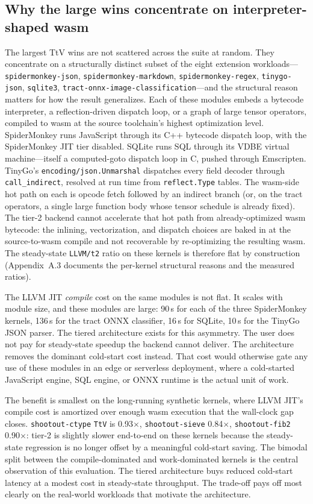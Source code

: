 \subsection*{Why the large wins concentrate on interpreter-shaped wasm}
\label{sec:eval:tt:interpreter}

The largest TtV wins are not scattered across the suite at random. They concentrate on a structurally distinct subset of the eight extension workloads---\texttt{spidermonkey-json}, \texttt{spidermonkey-markdown}, \texttt{spidermonkey-regex}, \texttt{tinygo-json}, \texttt{sqlite3}, \texttt{tract-onnx-image-classification}---and the structural reason matters for how the result generalizes. Each of these modules embeds a bytecode interpreter, a reflection-driven dispatch loop, or a graph of large tensor operators, compiled to wasm at the source toolchain's highest optimization level. SpiderMonkey runs JavaScript through its C++ bytecode dispatch loop, with the SpiderMonkey JIT tier disabled. SQLite runs SQL through its VDBE virtual machine---itself a computed-goto dispatch loop in C, pushed through Emscripten. TinyGo's \texttt{encoding/json.Unmarshal} dispatches every field decoder through \texttt{call\_indirect}, resolved at run time from \texttt{reflect.Type} tables.
The wasm-side hot path on each is opcode fetch followed by an indirect branch (or, on the tract operators, a single large function body whose tensor schedule is already fixed). The tier-2 backend cannot accelerate that hot path from already-optimized wasm bytecode: the inlining, vectorization, and dispatch choices are baked in at the source-to-wasm compile and not recoverable by re-optimizing the resulting wasm. The steady-state \texttt{LLVM/t2} ratio on these kernels is therefore flat by construction (Appendix~A.3 documents the per-kernel structural reasons and the measured ratios).

The LLVM JIT \emph{compile} cost on the same modules is not flat. It scales with module size, and these modules are large: 90\,s for each of the three SpiderMonkey kernels, 136\,s for the tract ONNX classifier, 16\,s for SQLite, 10\,s for the TinyGo JSON parser. The tiered architecture exists for this asymmetry. The user does not pay for steady-state speedup the backend cannot deliver. The architecture removes the dominant cold-start cost instead. That cost would otherwise gate any use of these modules in an edge or serverless deployment, where a cold-started JavaScript engine, SQL engine, or ONNX runtime is the actual unit of work.

The benefit is smallest on the long-running synthetic kernels, where LLVM JIT's compile cost is amortized over enough wasm execution that the wall-clock gap closes. \texttt{shootout-ctype} \texttt{TtV} is 0.93$\times$, \texttt{shootout-sieve} 0.84$\times$, \texttt{shootout-fib2} 0.90$\times$: tier-2 is slightly slower end-to-end on these kernels because the steady-state regression is no longer offset by a meaningful cold-start saving. The bimodal split between the compile-dominated and work-dominated kernels is the central observation of this evaluation. The tiered architecture buys reduced cold-start latency at a modest cost in steady-state throughput. The trade-off pays off most clearly on the real-world workloads that motivate the architecture.
